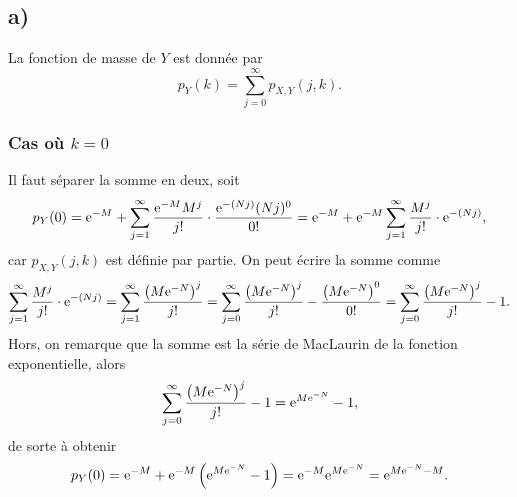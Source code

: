 \documentclass[11pt]{article}
\newcommand\e{%
    \ensuremath{%
        \mathrm{e}%
    }%
}
\begin{document}
\subsection{a)}
La fonction de masse de $Y$ est donnée par
\begin{equation*}
    p_Y(k)
    =\sum_{j=0}^\infty p_{X,Y}(j,k).
\end{equation*}

\subsubsection*{Cas où \boldmath $k=0$}
Il faut séparer la somme en deux, soit
\begin{equation*}
    p_Y(0)
    =\e^{-M}+\sum_{j=1}^\infty\frac{\e^{-M}M^j}{j!}
        \cdot\frac{\e^{-(Nj)}(Nj)^0}{0!}
    =\e^{-M}+\e^{-M}\sum_{j=1}^\infty\frac{M^j}{j!}
        \cdot\e^{-(Nj)},
\end{equation*}
car $p_{X,Y}(j,k)$ est définie par partie. On peut écrire la somme comme
\begin{equation*}
    \sum_{j=1}^\infty\frac{M^j}{j!}\cdot\e^{-(Nj)}
    =\sum_{j=1}^\infty\frac{\left(M\e^{-N}\right)^j}{j!}
    =\sum_{j=0}^\infty\frac{\left(M\e^{-N}\right)^j}{j!}
        -\frac{\left(M\e^{-N}\right)^0}{0!}
    =\sum_{j=0}^\infty\frac{\left(M\e^{-N}\right)^j}{j!}-1.
\end{equation*}
Hors, on remarque que la somme est la série de MacLaurin de la fonction
exponentielle, alors
\begin{equation*}
    \sum_{j=0}^\infty\frac{\left(M\e^{-N}\right)^j}{j!}-1
    =\e^{M\e^{-N}}-1,
\end{equation*}
de sorte à obtenir
\begin{equation*}
    p_Y(0)
    =\e^{-M}+\e^{-M}\left(\e^{M\e^{-N}}-1\right)
    =\e^{-M}\e^{M\e^{-N}}
    =\e^{M\e^{-N}-M}.
\end{equation*}
\end{document}
